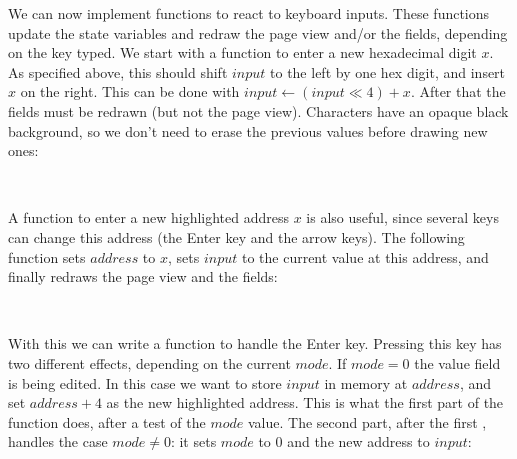 We can now implement functions to react to keyboard inputs. These functions
update the state variables and redraw the page view and/or the fields,
depending on the key typed. We start with a function to enter a new hexadecimal
digit $x$. As specified above, this should shift $input$ to the left by one hex
digit, and insert $x$ on the right. This can be done with $input \leftarrow
(input \ll 4) + x$. After that the fields must be redrawn (but not the page
view). Characters have an opaque black background, so we don't need to erase
the previous values before drawing new ones:

\begin{TwoColumns}
\\
\end{TwoColumns}

A function to enter a new highlighted address $x$ is also useful, since several
keys can change this address (the Enter key and the arrow keys). The following
function sets $address$ to $x$, sets $input$ to the current value at this
address, and finally redraws the page view and the fields:

\begin{TwoColumns}
\\
\end{TwoColumns}

With this we can write a function to handle the Enter key. Pressing this key
has two different effects, depending on the current $mode$. If $mode=0$ the
value field is being edited. In this case we want to store $input$ in memory at
$address$, and set $address+4$ as the new highlighted address. This is what the
first part of the function does, after a test of the $mode$ value. The second
part, after the first , handles the case $mode \ne 0$: it sets
$mode$ to $0$ and the new address to $input$:

\begin{TwoColumns}
\\
\end{TwoColumns}

